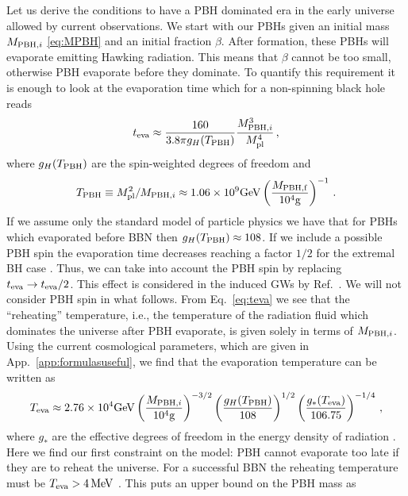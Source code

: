 \documentclass[a4paper,11pt]{article}
\numberwithin{equation}{section}
\begin{document}
Let us derive the conditions to have a PBH dominated era in the early universe allowed by current observations. We start with our PBHs given an initial mass $M_{{\rm PBH},i}$ \eqref{eq:MPBH} and an initial fraction $\beta$. After formation, these PBHs will evaporate emitting Hawking radiation. This means that $\beta$ cannot be too small, otherwise PBH evaporate before they dominate. To quantify this requirement it is enough to look at the evaporation time which for a non-spinning black hole reads \cite{Hawking:1974sw,Hooper:2019gtx,Inomata:2020lmk}
\begin{align}\label{eq:teva}
t_{\rm eva}\approx\frac{160}{3.8\pi g_H(T_{\rm PBH})}\frac{M_{{\rm PBH},i}^3}{M_{\rm pl}^4}\,,
\end{align}
where $g_H(T_{\rm PBH})$ are the spin-weighted degrees of freedom and
\begin{align}\label{eq:TPBH}
T_{\rm PBH}\equiv M_{\rm pl}^2/M_{{\rm PBH},i}\approx1.06\times 10^9{\rm GeV}\left(\frac{M_{\rm PBH,f}}{10^4{\rm g}}\right)^{-1}\,.
\end{align}
If we assume only the standard model of particle physics we have that for PBHs which evaporated before BBN then $g_H(T_{\rm PBH})\approx 108$. If we include a possible PBH spin the evaporation time decreases reaching a factor $1/2$ for the extremal BH case \cite{Dong:2015yjs,Arbey:2019jmj,Kuhnel:2019zbc,Arbey:2021ysg,Masina:2021zpu}. Thus, we can take into account the PBH spin by replacing $t_{\rm eva}\to t_{\rm eva}/2$. This effect is considered in the induced GWs by Ref.~\cite{Domenech:2021wkk}. We will not consider PBH spin in what follows. From Eq.~\eqref{eq:teva} we see that the ``reheating'' temperature, i.e., the temperature of the radiation fluid which dominates the universe after PBH evaporate, is given solely in terms of $M_{{\rm PBH},i}$. Using the current cosmological parameters, which are given in App.~\ref{app:formulasuseful}, we find that the evaporation temperature can be written as
\begin{align}\label{eq:Teva}
T_{\rm eva}\approx 2.76\times 10^4{\rm GeV}\left(\frac{M_{{\rm PBH},i}}{10^4{\rm g}}\right)^{-3/2}
\left(\frac{g_H(T_{\rm PBH})}{108}\right)^{1/2}\left(\frac{g_*(T_{\rm eva})}{106.75}\right)^{-1/4}\,,
\end{align}
where $g_*$ are the effective degrees of freedom in the energy density of radiation \cite{Husdal:2016haj,Saikawa:2018rcs}. Here we find our first constraint on the model: PBH cannot evaporate too late if they are to reheat the universe. For a successful BBN the reheating temperature must be $T_{\rm eva}>4 \,{\rm MeV}$ \cite{Kawasaki:1999na,Kawasaki:2000en,Hannestad:2004px,Hasegawa:2019jsa}. This puts an upper bound on the PBH mass as
\end{document}
